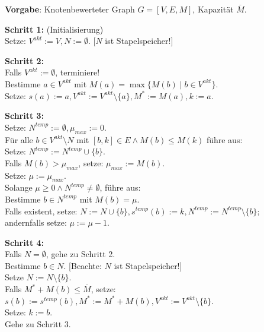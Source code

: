 \begin{algo}
\label{Algo Huborientiertes Verfahren BS}
\textbf{Vorgabe}: Knotenbewerteter Graph $G=[V,E,M]$, Kapazität $\overline{M}$.

\noindent 
\textbf{Schritt 1:} (Initialisierung)\\
\phantom \quad Setze: $V^{akt} := V, N := \emptyset$.  [$N$ ist Stapelspeicher!]

\noindent 
\textbf{Schritt 2:}\\
\phantom \quad Falls $V^{akt} := \emptyset$, terminiere!\\
\phantom \quad Bestimme $a \in V^{akt}$ mit $M(a) = \max\{M(b) \mid b \in V^{akt}\}$.\\
\phantom \quad Setze: $s(a) := a, V^{akt} := V^{akt} \setminus \{a\}, M^* := M(a), k := a$.

\noindent 
\textbf{Schritt 3:}\\
\phantom \quad Setze: $N^{temp} := \emptyset, \mu_{max} := 0$.\\
\phantom \quad Für alle $b \in V^{akt}\setminus N$ mit $[b,k] \in E \wedge M(b) \leq M(k)$ führe aus:\\ 
\phantom \quad \qquad Setze: $N^{temp} := N^{temp} \cup \{b\}$.\\
\phantom \quad \qquad Falls $M(b) > \mu_{max}$, setze: $\mu_{max} := M(b)$.\\
\phantom \quad Setze: $\mu := \mu_{max}$.\\
\phantom \quad Solange $\mu \geq 0 \wedge N^{temp} \neq \emptyset$, führe aus:\\
\phantom \quad \qquad Bestimme $b \in N^{temp}$ mit $M(b) = \mu$.\\
\phantom \quad \qquad Falls existent, setze: $N :=N \cup \{b\}, s^{temp}(b) := k, N^{temp} := N^{temp} \setminus \{b\}$;\\
\phantom \quad \qquad andernfalls setze: $\mu := \mu - 1$.

\noindent 
\textbf{Schritt 4:}\\
\phantom \quad Falls $N = \emptyset$, gehe zu Schritt 2.\\
\phantom \quad Bestimme $b \in N$. [Beachte: $N$ ist Stapelspeicher!]\\
\phantom \quad Setze $N := N \setminus \{b\}$.\\
\phantom \quad Falls $M^* + M(b) \leq \overline{M}$, setze: $s(b) := s^{temp}(b), M^* := M^* + M(b), V^{akt} := V^{akt} \setminus \{b\}$.\\
\phantom \quad Setze: $k := b$.\\
\phantom \quad Gehe zu Schritt 3.
\end{algo}

